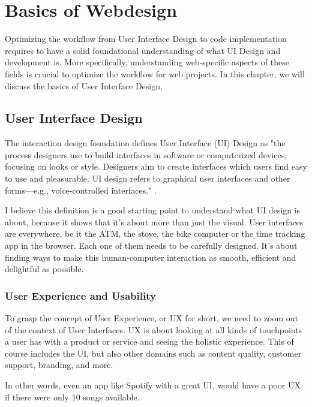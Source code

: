 \section{Basics of Webdesign}
Optimizing the workflow from User Interface Design to code implementation requires to have a solid foundational understanding of what UI Design and development is.
More specifically, understanding web-specific aspects of these fields is crucial to optimize the workflow for web projects.
In this chapter, we will discuss the basics of User Interface Design, 
    
    \subsection{User Interface Design}
    The interaction design foundation defines User Interface (UI) Design as 
    "the process designers use to build interfaces in software or computerized devices, 
    focusing on looks or style. Designers aim to create interfaces which users find easy to use and pleasurable. 
    UI design refers to graphical user interfaces and other forms—e.g., voice-controlled interfaces." .
    
    I believe this definition is a good starting point to understand what UI design is about, because it shows that it's about more than just the visual.
    User interfaces are everywhere, be it the ATM, the stove, the bike computer or the time tracking app in the browser. 
    Each one of them needs to be carefully designed. It's about finding ways to make this human-computer interaction as smooth, efficient and delightful as possible.

    

        \subsubsection{User Experience and Usability}
        To grasp the concept of User Experience, or UX for short, we need to zoom out of the context of User Interfaces.
        UX is about looking at all kinds of touchpoints a user has with a product or service and seeing the holistic experience.
        This of course includes the UI, but also other domains such as content quality, customer support, branding, and more. 

        In other words, even an app like Spotify with a great UI, would have a poor UX if there were only 10 songs available.
        
